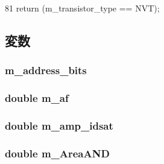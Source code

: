 \begin{DoxyCode}
81 { return (m_transistor_type == NVT); }
\end{DoxyCode}


\subsection{変数}
\hypertarget{classTechParameter_a5fee5042d346000013597e0fba415b07}{
\subsubsection[{m\_\-address\_\-bits}]{ {\bf m\_\-address\_\-bits}}}
\label{classTechParameter_a5fee5042d346000013597e0fba415b07}
\hypertarget{classTechParameter_a33c4fa4c023d45df03bbdbeb0e872ecc}{
\subsubsection[{m\_\-af}]{\setlength{\rightskip}{0pt plus 5cm}double {\bf m\_\-af}}}
\label{classTechParameter_a33c4fa4c023d45df03bbdbeb0e872ecc}
\hypertarget{classTechParameter_a0de4e18c31d8dc364ffc1b6d1ce4a289}{
\subsubsection[{m\_\-amp\_\-idsat}]{\setlength{\rightskip}{0pt plus 5cm}double {\bf m\_\-amp\_\-idsat}}}
\label{classTechParameter_a0de4e18c31d8dc364ffc1b6d1ce4a289}
\hypertarget{classTechParameter_ac470c79231da28f10eab4b1dd6941507}{
\subsubsection[{m\_\-AreaAND}]{\setlength{\rightskip}{0pt plus 5cm}double {\bf m\_\-AreaAND}}}
